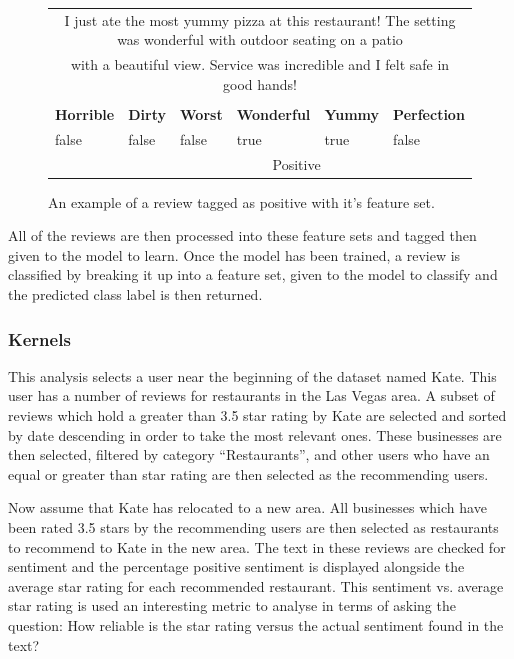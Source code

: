 \begin{figure}[h!]
\centering
\begin{tabular}{ |p{2cm}|p{2cm}|p{2cm}|p{2cm}|p{2cm}|p{2cm}|}
 \hline
 \rowcolor{Gray}
 \multicolumn{6}{|c|}{Review Text} \\
 \hline
 \multicolumn{6}{|c|}{I just ate the most yummy pizza at this restaurant! The setting was wonderful with outdoor seating on a patio} \\
 \multicolumn{6}{|c|}{ with a beautiful view. Service was incredible and I felt safe in good hands!} \\
 \hline
 \rowcolor{Gray}
 \multicolumn{6}{|c|}{Feature Set} \\
 \hline
 \textbf{Horrible} & \textbf{Dirty} & \textbf{Worst} & \textbf{Wonderful} & \textbf{Yummy} & \textbf{Perfection} \\
 \hline
 false & false & false & true & true & false \\
 \hline
 \rowcolor{LightGray}
 \multicolumn{1}{|c|}{Tag} & \multicolumn{5}{|c|}{Positive} \\
 \hline
\end{tabular}
\vspace*{5mm}
\caption{An example of a review tagged as positive with it's feature set.}
\label{fig:bog-attri}
\end{figure}

All of the reviews are then processed into these feature sets and tagged then given to the model to learn. Once the model has been trained, a review is classified by breaking it up into a feature set, given to the model to classify and the predicted class label is then returned.

\subsubsection{Kernels}

This analysis selects a user near the beginning of the dataset named Kate. This user has a number of reviews for restaurants in the Las Vegas area. A subset of reviews which hold a greater than 3.5 star rating by Kate are selected and sorted by date descending in order to take the most relevant ones. These businesses are then selected, filtered by category ``Restaurants'', and other users who have an equal or greater than star rating are then selected as the recommending users. 

Now assume that Kate has relocated to a new area. All businesses which have been rated 3.5 stars by the recommending users are then selected as restaurants to recommend to Kate in the new area. The text in these reviews are checked for sentiment and the percentage positive sentiment is displayed alongside the average star rating for each recommended restaurant. This sentiment vs. average star rating is used an interesting metric to analyse in terms of asking the question: How reliable is the star rating versus the actual sentiment found in the text?

